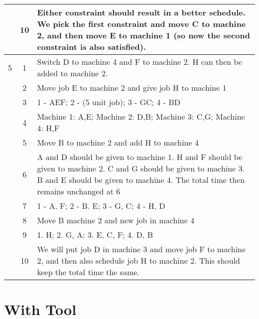 \begin{tabularx}{\linewidth}{c c X}
	& 10 & Either constraint should result in a better schedule. We pick the first constraint and move C to machine 2, and then move E to machine 1 (so now the second constraint is also satisfied). \\
	\hline
	5 & 1 & Switch D to machine 4 and F to machine 2. H can then be added to machine 2. \\
	& 2 & Move job E to machine 2 and give job H to machine 1 \\
	& 3 & 1 - AEF; 2 - (5 unit job); 3 - GC; 4 - BD \\
	& 4 & Machine 1: A,E; Machine 2: D,B; Machine 3: C,G; Machine 4: H,F \\
	& 5 & Move B to machine 2 and add H to machine 4 \\
	& 6 & A and D should be given to machine 1. H and F should be given to machine 2. C and G should be given to machine 3. B and E should be given to machine 4. The total time then remains unchanged at 6 \\
	& 7 & 1 - A, F; 2 - B. E; 3 - G, C; 4 - H, D \\
	& 8 & Move B machine 2 and new job in machine 4 \\
	& 9 & 1. H; 2. G, A; 3. E, C, F; 4. D, B \\
	& 10 & We will put job D in machine 3 and move job F to machine 2, and then also schedule job H to machine 2. This should keep the total time the same. \\
\end{tabularx}

\section{With Tool}